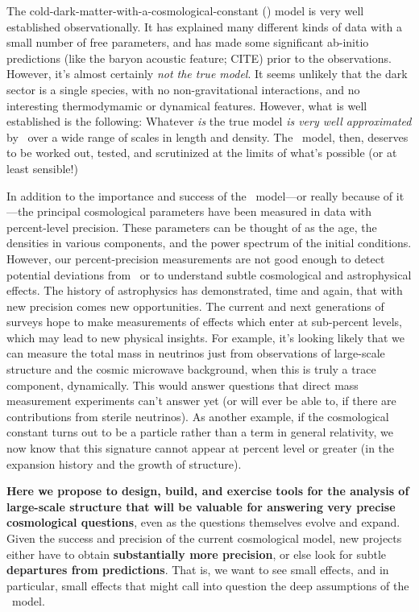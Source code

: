 \documentclass[12pt, fullpage, letterpaper]{article}
\begin{document}
The cold-dark-matter-with-a-cosmological-constant (\LCDM) model is
very well established observationally.
It has explained many different
kinds of data with a small number of free parameters, and has made
some significant ab-initio predictions (like the baryon acoustic feature; CITE)
prior to the observations.
However, it's almost certainly \emph{not the true model}.
It seems unlikely that the dark sector is a single species, with no
non-gravitational interactions, and no interesting thermodymamic or
dynamical features.
However, what is well established is the following:
Whatever \emph{is} the true model \emph{is very well approximated} by
\LCDM\ over a wide range of scales in length and density.
The \LCDM\ model, then, deserves to be worked out, tested, and scrutinized at the
limits of what's possible (or at least sensible!)

In addition to the importance and success of the \LCDM\ model---or
really because of it---the principal cosmological parameters have been
measured in data with percent-level precision.
These parameters can be thought of as the age, the densities in
various components, and the power spectrum of the initial conditions.
However, our percent-precision measurements are not good enough to
detect potential deviations from \LCDM\, or to understand subtle
cosmological and astrophysical effects.
The history of astrophysics has demonstrated, time and again,
that with new precision comes new opportunities.
The current and next generations of surveys hope to
make measurements of effects which enter at sub-percent levels,
which may lead to new physical insights.
For example, it's looking likely that we can measure the total mass in
neutrinos just from observations of large-scale structure and the
cosmic microwave background, when this is truly a trace component,
dynamically.
This would answer questions that direct mass measurement experiments
can't answer yet (or will ever be able to, if there are contributions from sterile neutrinos).
As another example, if the cosmological constant turns out to be a particle rather
than a term in general relativity, we now know that
this signature cannot appear at percent level or greater (in the
expansion history and the growth of structure).

\textbf{Here we propose to design, build, and exercise tools for the
analysis of large-scale structure that will
  be valuable for answering very precise cosmological questions}, even
as the questions themselves evolve and expand.
Given the success and precision of the current
cosmological model, new projects either have to obtain
\textbf{substantially more precision}, or else look for subtle
\textbf{departures from predictions}.
That is, we want to see small effects, and in particular, small
effects that might call into question the deep assumptions of the
\LCDM\ model.
\end{document}
